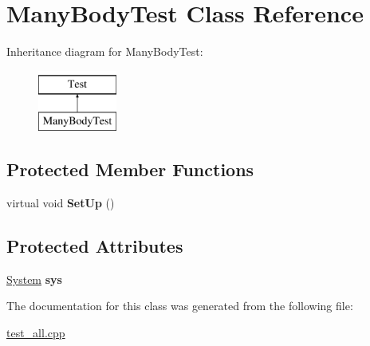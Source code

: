 \hypertarget{classManyBodyTest}{\section{Many\-Body\-Test Class Reference}
\label{classManyBodyTest}
}
Inheritance diagram for Many\-Body\-Test\-:\begin{figure}[H]
\begin{center}
\leavevmode
\includegraphics[height=2.000000cm]{classManyBodyTest}
\end{center}
\end{figure}
\subsection*{Protected Member Functions}
\begin{DoxyCompactItemize}
\item 
\hypertarget{classManyBodyTest_a6c34cfd6d22c704a789326f44a9160b8}{virtual void {\bfseries Set\-Up} ()}\label{classManyBodyTest_a6c34cfd6d22c704a789326f44a9160b8}

\end{DoxyCompactItemize}
\subsection*{Protected Attributes}
\begin{DoxyCompactItemize}
\item 
\hypertarget{classManyBodyTest_af8d50c4cbc9a4031bed7a467fa5da6ca}{\hyperlink{classsim__system_1_1System}{System} {\bfseries sys}}\label{classManyBodyTest_af8d50c4cbc9a4031bed7a467fa5da6ca}

\end{DoxyCompactItemize}


The documentation for this class was generated from the following file\-:\begin{DoxyCompactItemize}
\item 
\hyperlink{test__all_8cpp}{test\-\_\-all.\-cpp}\end{DoxyCompactItemize}
